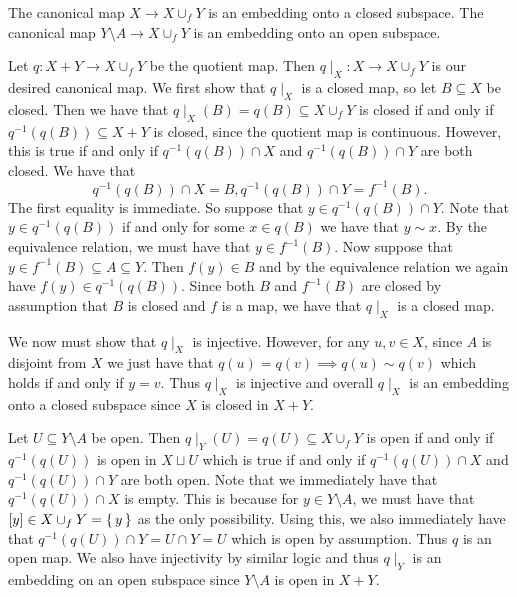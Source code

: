 \documentclass[letterpaper, 11pt, oneside]{book}
\begin{document}
\begin{prop}\label{prop: attachment_mappings}
  The canonical map $X \to X \cup_{f} Y$ is an embedding onto a closed subspace.
  The canonical map $Y \setminus A \to X \cup_{f} Y$ is an embedding onto an open subspace.
\end{prop}
\begin{pf}
  Let $q\colon X + Y \to X \cup_{f} Y$ be the quotient map.
  Then $q\mid_{X}\colon X \to X \cup_{f} Y$ is our desired canonical map.
  We first show that $q\mid_{X}$ is a closed map, so let $B \subseteq X$ be closed.
  Then we have that $q\mid_{X}(B) = q(B) \subseteq X \cup_{f} Y$ is closed if and only if $q^{-1}(q(B)) \subseteq X + Y$ is closed, since the quotient map is continuous.
  However, this is true if and only if $q^{-1}(q(B)) \cap X$ and $q^{-1}(q(B)) \cap Y$ are both closed.
  We have that
  \[
    q^{-1}(q(B)) \cap X = B, q^{-1}(q(B)) \cap Y = f^{-1}(B).
  \]
  The first equality is immediate.
  So suppose that $y \in q^{-1}(q(B)) \cap Y$.
  Note that $y \in q^{-1}(q(B))$ if and only for some $x \in q(B)$ we have that $y \sim x$.
  By the equivalence relation, we must have that $y \in f^{-1}(B)$.
  Now suppose that $y \in f^{-1}(B) \subseteq A \subseteq Y$.
  Then $f(y) \in B$ and by the equivalence relation we again have $f(y) \in q^{-1}(q(B))$.
  Since both $B$ and $f^{-1}(B)$ are closed by assumption that $B$ is closed and $f$ is a map, we have that $q\mid_{X}$ is a closed map.

  We now must show that $q\mid_{X}$ is injective.
  However, for any $u, v \in X$, since $A$ is disjoint from $X$ we just have that $q(u) = q(v) \implies q(u) \sim q(v)$ which holds if and only if $y = v$.
  Thus $q\mid_{X}$ is injective and overall $q\mid_{X}$ is an embedding onto a closed subspace since $X$ is closed in $X + Y$.

  Let $U \subseteq Y \setminus A$ be open.
  Then $q\mid_Y(U) = q(U) \subseteq X \cup_f Y$ is open if and only if $q^{-1}(q(U))$ is open in $X \sqcup U$ which is true if and only if $q^{-1}(q(U)) \cap X$ and $q^{-1}(q(U)) \cap Y$ are both open.
  Note that we immediately have that $q^{-1}(q(U)) \cap X$ is empty.
  This is because for $y \in Y \setminus A$, we must have that $[y] \in X \cup_{f} Y = \set{y}$ as the only possibility.
  Using this, we also immediately have that $q^{-1}(q(U)) \cap Y = U \cap Y = U$ which is open by assumption.
  Thus $q$ is an open map.
  We also have injectivity by similar logic and thus $q\mid_{Y}$ is an embedding on an open subspace since $Y \setminus A$ is open in $X + Y$.
\end{pf}
\end{document}
